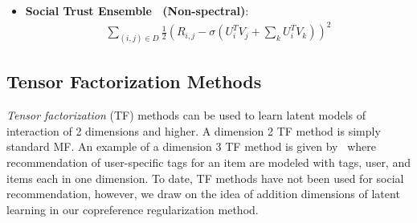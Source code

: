 \begin{itemize}
\item {\bf Social Trust Ensemble~\cite{ste} (Non-spectral)}:
\begin{align}
\sum_{(i,j) \in D} \frac{1}{2} (R_{i,j} - \sigma (U_i^T V_j + \sum_k U_i^T V_k))^2 \nonumber
\end{align}
\end{itemize}

\subsection{Tensor Factorization Methods}


\emph{Tensor factorization} (TF) methods can be used to learn latent
models of interaction of 2 dimensions and higher.  A dimension 2 TF
method is simply standard MF.  An example of a dimension 3 TF method
is given by~\cite{tf} where recommendation of user-specific tags for
an item are modeled with tags, user, and items each in one dimension.
To date, TF methods have not been used for social recommendation,
however, we draw on the idea of addition dimensions of latent learning
in our copreference regularization method.


